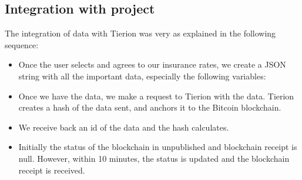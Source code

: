 \subsection{Integration with project}
The integration of data with Tierion was very as explained in the following sequence:
\begin{itemize}
    \item Once the user selects and agrees to our insurance rates, we create a JSON string with all the important data, especially the following variables:
    \item Once we have the data, we make a request to Tierion with the data. Tierion creates a hash of the data sent, and anchors it to the Bitcoin blockchain.
    \item We receive back an id of the data and the hash calculates.
    \item Initially the status of the blockchain in unpublished and blockchain receipt is null. However, within 10 minutes, the status is updated and the blockchain receipt is received.
\end{itemize}